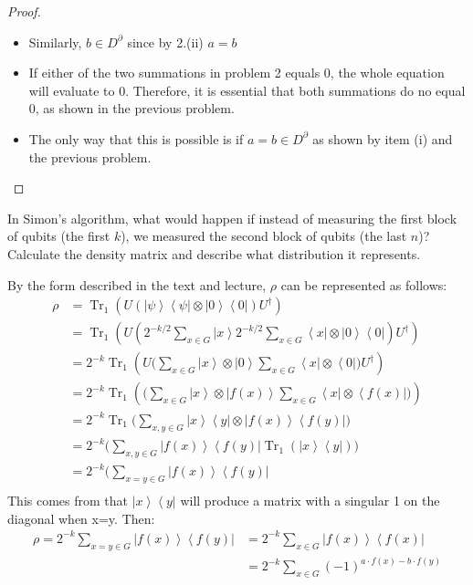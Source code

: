 \documentclass{exam} %
\theoremstyle{plain}
\theoremstyle{definition}
\theoremstyle{remark}
\numberwithin{equation}{section}  %
\newcommand{\bra}[1]{ \left< #1 \right| }
\newcommand{\ket}[1]{ \left| #1 \right> }
\DeclareMathOperator{\Tr}{Tr}
\begin{document}
\begin{questions}
\begin{solution}
\begin{proof}
\begin{itemize}
      \item Similarly, $b\in D^\partial$ since by 2.(ii) $a=b$
      \item If either of the two summations in problem 2 equals 0, the whole
        equation will evaluate to 0. Therefore, it is essential that both
        summations do no equal 0, as shown in the previous problem.
      \item The only way that this is possible is if $a=b\in D^\partial$ as
        shown by item (i) and the previous problem.
    \end{itemize}
  \end{proof}
\end{solution}
\question In Simon's algorithm, what would happen if instead of measuring
the first block of qubits (the first $k$), we measured the second block of
qubits (the last $n$)? Calculate the density matrix and describe what
distribution it represents.
\begin{solution}
  By the form described in the text and lecture, $\rho$ can be represented as
  follows:
  \begin{align*}
    \rho 
    &= \Tr_1(U(\ket{\psi}\bra{\psi}\otimes\ket{0}\bra{0})U^\dagger)\\
    &= \Tr_1(U(2^{-k/2}\sum_{x\in G} \ket{x} 2^{-k/2}\sum_{x\in G} \bra{x} 
    \otimes\ket{0}\bra{0})U^\dagger)\\
    &= 2^{-k}\Tr_1(U\big(\sum_{x\in G} \ket{x}\otimes\ket{0} 
    \sum_{x\in G} \bra{x}\otimes \bra{0}\big)U^\dagger)\\
    &= 2^{-k}\Tr_1(\big(\sum_{x\in G} \ket{x}\otimes\ket{f(x)} 
    \sum_{x\in G} \bra{x}\otimes \bra{f(x)}\big))\\
    &= 2^{-k}\Tr_1\big(\sum_{x,y\in G} \ket{x}\bra{y}\otimes \ket{f(x)} 
    \bra{f(y)}\big)\\
    &= 2^{-k}\big(\sum_{x,y\in G} \ket{f(x)}\bra{f(y)}\Tr_1(\ket{x}\bra{y})\big)\\
    &= 2^{-k}\big(\sum_{x = y\in G} \ket{f(x)}\bra{f(y)}\\
  \end{align*}
  This comes from that $\ket{x}\bra{y}$ will produce a matrix with a singular
  1 on the diagonal when x=y. Then:
  \begin{align*}
    \rho = 2^{-k}\sum_{x=y\in G} \ket{f(x)}\bra{f(y)}
    &= 2^{-k}\sum_{x\in G} \ket{f(x)}\bra{f(x)}\\
    &= 2^{-k}\sum_{x\in G} (-1)^{a\cdot f(x) - b\cdot f(y)}\\

\end{align*}
\end{solution}
\end{questions}
\end{document}
